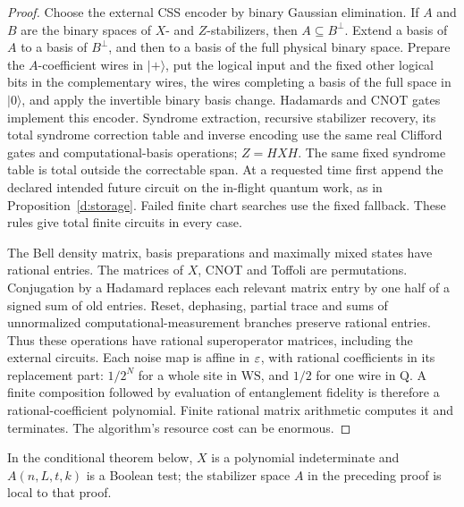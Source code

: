 \begin{proof}
Choose the external CSS encoder by binary Gaussian elimination. If
\(A\) and \(B\) are the binary spaces of \(X\)- and \(Z\)-stabilizers,
then \(A\subseteq B^\perp\). Extend a basis of \(A\) to a basis of
\(B^\perp\), and then to a basis of the full physical binary space.
Prepare the \(A\)-coefficient wires in \(\lvert+\rangle\), put the logical
input and the fixed other logical bits in the complementary wires, the
wires completing a basis of the full space in \(\lvert0\rangle\), and apply the invertible binary basis change. Hadamards and CNOT gates
implement this encoder. Syndrome extraction, recursive stabilizer
recovery, its total syndrome correction table and inverse encoding use the same real
Clifford gates and computational-basis operations; \(Z=HXH\). The same fixed syndrome table is total outside the correctable span.
At a requested time first append the declared intended future circuit
on the in-flight quantum work, as in
Proposition~\ref{d:storage}. Failed finite chart searches use the
fixed fallback. These rules give total finite circuits in every case.

The Bell density matrix, basis preparations and maximally mixed states
have rational entries. The matrices of \(X\), CNOT and Toffoli are
permutations. Conjugation by a Hadamard replaces each relevant matrix
entry by one half of a signed sum of old entries. Reset, dephasing,
partial trace and sums of unnormalized computational-measurement
branches preserve rational entries. Thus these operations have rational
superoperator matrices, including the external circuits. Each noise map
is affine in \(\varepsilon\), with rational coefficients in its replacement part: \(1/2^N\) for a whole
site in \(\mathrm{WS}\), and \(1/2\) for one wire in \(\mathrm Q\). A finite composition followed
by evaluation of entanglement fidelity is therefore a rational-coefficient polynomial. Finite rational matrix
arithmetic computes it and terminates. The algorithm's resource cost
can be enormous.
\end{proof}

In the conditional theorem below, \(X\) is a polynomial indeterminate and \(A(n,L,t,k)\) is a Boolean test; the stabilizer space \(A\) in the preceding proof is local to that proof.


